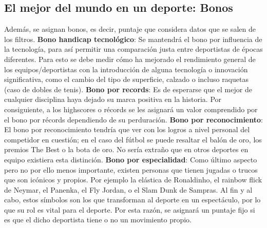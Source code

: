 \documentclass[a4paper]{article}
\begin{document}
\subsection{El mejor del mundo en un deporte: Bonos}
Además, se asignan bonos, es decir, puntaje que considera datos que se salen de los filtros.  \newline\newline \textbf{Bono handicap tecnológico}: Se mantendrá el bono por influencia de la tecnología, para así permitir una comparación justa entre deportistas de épocas diferentes. Para esto se debe medir cómo ha mejorado el rendimiento general de los equipos/deportistas con la introducción de alguna tecnología o innovación significativa, como el cambio del tipo de superficie, calzado o incluso raquetas (caso de dobles de tenis). \newline\newline \textbf{Bono por records}: Es de esperarse que el mejor de cualquier disciplina haya dejado su marca positiva en la historia. Por consiguiente, a los highscores o récords se les asignará un valor comprendido por el bono por récords dependiendo de su perduración. \newline\newline \textbf{Bono por reconocimiento}: El bono por reconocimiento tendría que ver con los logros a nivel personal del competidor en cuestión; en el caso del fútbol se puede resaltar el balón de oro, los premios The Best o la bota de oro. No sería extraño que en otros deportes en equipo existiera esta distinción. \newline\newline \textbf{Bono por especialidad}: Como último aspecto pero no por ello menos importante, existen personas que tienen jugadas o trucos que son icónicos y propios. Por ejemplo la elástica de Ronaldinho, el rainbow flick de Neymar, el Panenka, el Fly Jordan, o el Slam Dunk de Sampras. Al fin y al cabo, estos símbolos son los que transforman al deporte en un espectáculo, por lo que su rol es vital para el deporte. Por esta razón, se asignará un puntaje fijo si es que el dicho deportista tiene o no un movimiento propio. 
\end{document}
